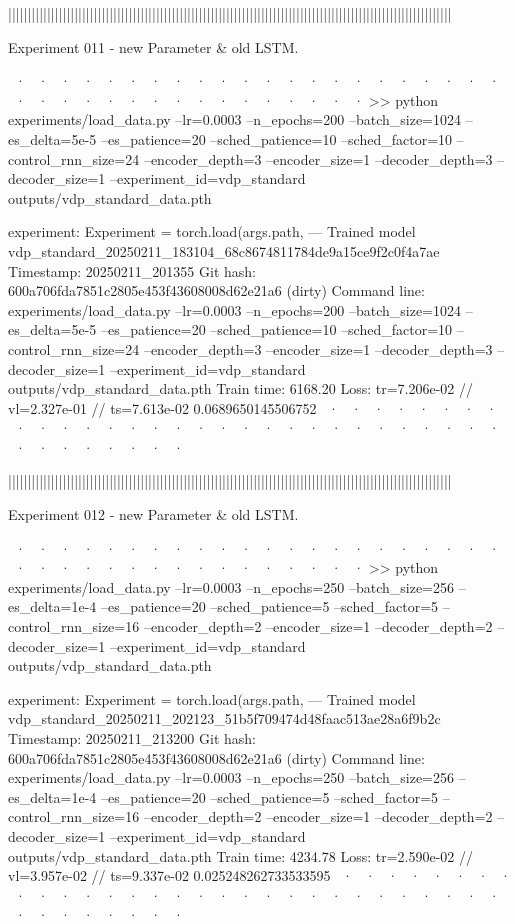 ||||||||||||||||||||||||||||||||||||||||||||||||||||||||||||||||||||||||||||||||||||||||||||||||||||||||||||||||||


Experiment 011 - new Parameter & old LSTM. 


~· ~· ~· ~· ~· ~· ~· ~· ~· ~· ~· ~· ~· ~· ~· ~· ~· ~· ~· ~· ~· ~· ~· ~· ~· ~· ~· ~· ~· ~· ~· ~· ~· ~· ~· ~· ~· ~· 
>> python experiments/load_data.py --lr=0.0003 --n_epochs=200 --batch_size=1024 --es_delta=5e-5 --es_patience=20 --sched_patience=10 --sched_factor=10 --control_rnn_size=24 --encoder_depth=3 --encoder_size=1 --decoder_depth=3 --decoder_size=1 --experiment_id=vdp_standard outputs/vdp_standard_data.pth

  experiment: Experiment = torch.load(args.path,
--- Trained model   vdp_standard_20250211_183104_68c8674811784de9a15ce9f2c0f4a7ae
Timestamp:      20250211_201355
Git hash:       600a706fda7851c2805e453f43608008d62e21a6 (dirty)
Command line:   experiments/load_data.py --lr=0.0003 --n_epochs=200 --batch_size=1024 --es_delta=5e-5 --es_patience=20 --sched_patience=10 --sched_factor=10 --control_rnn_size=24 --encoder_depth=3 --encoder_size=1 --decoder_depth=3 --decoder_size=1 --experiment_id=vdp_standard outputs/vdp_standard_data.pth
Train time:     6168.20
Loss:           tr=7.206e-02 // vl=2.327e-01 // ts=7.613e-02
0.0689650145506752
~· ~· ~· ~· ~· ~· ~· ~· ~· ~· ~· ~· ~· ~· ~· ~· ~· ~· ~· ~· ~· ~· ~· ~· ~· ~· ~· ~· ~· ~· ~· ~· ~· ~· ~· ~· ~· ~· 



||||||||||||||||||||||||||||||||||||||||||||||||||||||||||||||||||||||||||||||||||||||||||||||||||||||||||||||||||


Experiment 012 - new Parameter & old LSTM.


~· ~· ~· ~· ~· ~· ~· ~· ~· ~· ~· ~· ~· ~· ~· ~· ~· ~· ~· ~· ~· ~· ~· ~· ~· ~· ~· ~· ~· ~· ~· ~· ~· ~· ~· ~· ~· ~· 
>> python experiments/load_data.py --lr=0.0003 --n_epochs=250 --batch_size=256 --es_delta=1e-4 --es_patience=20 --sched_patience=5 --sched_factor=5 --control_rnn_size=16 --encoder_depth=2 --encoder_size=1 --decoder_depth=2 --decoder_size=1 --experiment_id=vdp_standard outputs/vdp_standard_data.pth

experiment: Experiment = torch.load(args.path,
--- Trained model   vdp_standard_20250211_202123_51b5f709474d48faac513ae28a6f9b2c
Timestamp:      20250211_213200
Git hash:       600a706fda7851c2805e453f43608008d62e21a6 (dirty)
Command line:   experiments/load_data.py --lr=0.0003 --n_epochs=250 --batch_size=256 --es_delta=1e-4 --es_patience=20 --sched_patience=5 --sched_factor=5 --control_rnn_size=16 --encoder_depth=2 --encoder_size=1 --decoder_depth=2 --decoder_size=1 --experiment_id=vdp_standard outputs/vdp_standard_data.pth
Train time:     4234.78
Loss:           tr=2.590e-02 // vl=3.957e-02 // ts=9.337e-02
0.025248262733533595
~· ~· ~· ~· ~· ~· ~· ~· ~· ~· ~· ~· ~· ~· ~· ~· ~· ~· ~· ~· ~· ~· ~· ~· ~· ~· ~· ~· ~· ~· ~· ~· ~· ~· ~· ~· ~· ~· 



